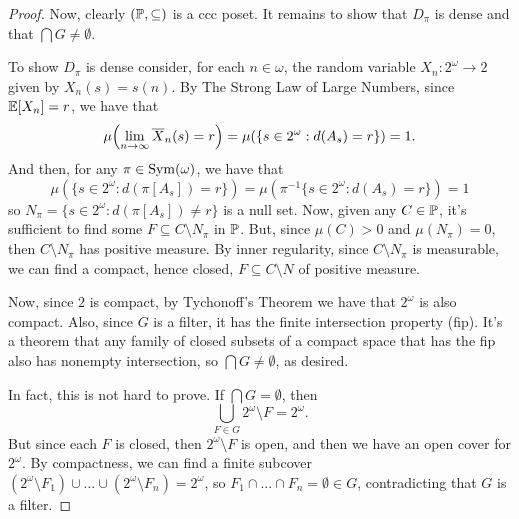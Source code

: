 \begin{proof}
    Now, clearly $(\mathbb{P},\subseteq)$ is a ccc poset. It remains to show that $D_\pi$ is dense and that $\bigcap G\neq\emptyset$.

    To show $D_\pi$ is dense consider, for each $n\in\omega$, the random variable $X_n:2^\omega\to 2$ given by $X_n(s)=s(n)$. By The Strong Law of Large Numbers, since $\mathbb{E}[X_n]=r$, we have that
    $$\mu{\left(\lim_{n\to\infty}\overline{X}_n(s)=r\right)}=\mu(\{s\in2^\omega:d(A_s)=r\})=1.$$
    And then, for any $\pi\in\mathrm{Sym}(\omega)$, we have that
    $$\mu(\{s\in2^\omega:d(\pi[A_s])=r\})=\mu(\pi^{-1}\{s\in2^\omega:d(A_s)=r\})=1$$
    so $N_\pi=\{s\in2^\omega:d(\pi[A_s])\neq r\}$ is a null set. Now, given any $C\in\mathbb{P}$, it's sufficient to find some $F\subseteq C\setminus N_\pi$ in $\mathbb{P}$. But, since $\mu(C)>0$ and $\mu(N_\pi)=0$, then $C\setminus N_\pi$ has positive measure. By inner regularity, since $C\setminus N_\pi$ is measurable, we can find a compact, hence closed, $F\subseteq C\setminus N$ of positive measure.

    Now, since $2$ is compact, by Tychonoff's Theorem we have that $2^\omega$ is also compact. Also, since $G$ is a filter, it has the finite intersection property (fip). It's a theorem that any family of closed subsets of a compact space that has the fip also has nonempty intersection, so $\bigcap G\neq\emptyset$, as desired.

    In fact, this is not hard to prove. If $\bigcap G=\emptyset$, then
    $$\bigcup_{F\in G}2^\omega\setminus F=2^\omega.$$
    But since each $F$ is closed, then $2^\omega\setminus F$ is open, and then we have an open cover for $2^\omega$. By compactness, we can find a finite subcover $(2^\omega\setminus F_1)\cup\dots\cup(2^\omega\setminus F_n)=2^\omega$, so $F_1\cap\dots\cap F_n=\emptyset\in G$, contradicting that $G$ is a filter.
\end{proof}